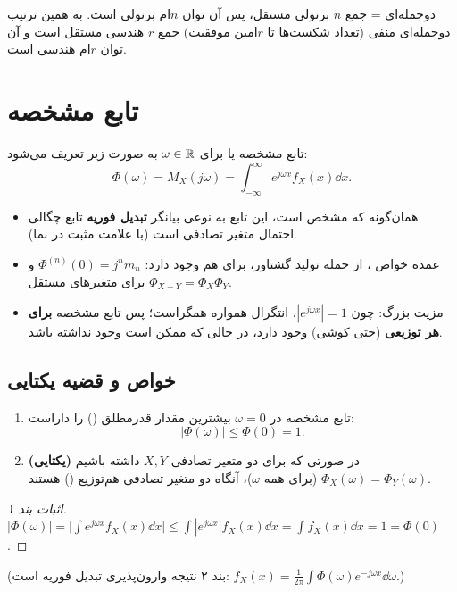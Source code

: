 \begin{note}
\notetitle دوجمله‌ای = جمع $n$ برنولی مستقل، پس  آن توان $n$ام  برنولی است. به همین ترتیب دوجمله‌ای منفی (تعداد شکست‌ها تا $r$امین موفقیت) جمع $r$ هندسی مستقل است و  آن توان $r$ام  هندسی است.
\end{note}

\section{تابع مشخصه }

\begin{definition}
تابع مشخصه یا  برای $\omega\in\mathbb{R}$ به صورت زیر تعریف می‌شود:
\[
\Phi(\omega)=M_X(j\omega)=\int_{-\infty}^{\infty}e^{j\omega x}f_X(x)\dd x .
\]
\end{definition}
\begin{itemize}
\item همان‌گونه که مشخص است، این تابع به نوعی بیانگر \textbf{تبدیل فوریه} تابع چگالی احتمال متغیر تصادفی است (با علامت مثبت در نما).
\item عمده خواص ، از جمله تولید گشتاور، برای  هم وجود دارد: $\Phi^{(n)}(0)=j^nm_n$ و برای متغیرهای مستقل $\Phi_{X+Y}=\Phi_X\Phi_Y$.
\item مزیت بزرگ: چون $|e^{j\omega x}|=1$، انتگرال همواره همگراست؛ پس تابع مشخصه \textbf{برای هر توزیعی} (حتی کوشی) وجود دارد، در حالی که  ممکن است وجود نداشته باشد.
\end{itemize}

\subsection{خواص و قضیه یکتایی}
\begin{theorem}
\begin{enumerate}
\item تابع مشخصه در $\omega=0$ بیشترین مقدار قدرمطلق () را داراست:
\[
|\Phi(\omega)|\le\Phi(0)=1 .
\]
\item \textbf{(یکتایی)} در صورتی که برای دو متغیر تصادفی $X,Y$ داشته باشیم $\Phi_X(\omega)=\Phi_Y(\omega)$ (برای همه $\omega$)، آنگاه دو متغیر تصادفی هم‌توزیع () هستند.
\end{enumerate}
\end{theorem}
\begin{proof}[اثبات بند ۱]
$|\Phi(\omega)|=\big|\int e^{j\omega x}f_X(x)\dd x\big|\le\int|e^{j\omega x}|f_X(x)\dd x=\int f_X(x)\dd x=1=\Phi(0)$.
\end{proof}
(بند ۲ نتیجه وارون‌پذیری تبدیل فوریه است: $f_X(x)=\frac{1}{2\pi}\int\Phi(\omega)e^{-j\omega x}\dd\omega$.)

